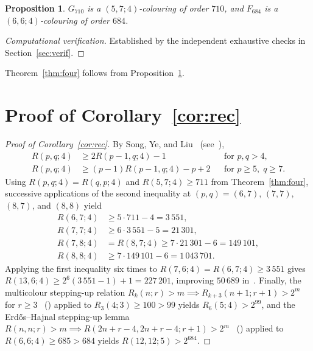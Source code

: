 \documentclass[11pt]{article}
\newtheorem{proposition}[theorem]{Proposition}
\theoremstyle{remark}
\begin{document}
\begin{proposition}\label{prop:proj}
$G_{710}$ is a $(5,7;4)$-colouring of order $710$, and $F_{684}$ is a
$(6,6;4)$-colouring of order $684$.
\end{proposition}

\begin{proof}[Computational verification]
Established by the independent exhaustive checks in Section~\ref{sec:verif}.
\end{proof}

Theorem~\ref{thm:four} follows from Proposition~\ref{prop:proj}.

\section{Proof of Corollary~\ref{cor:rec}}\label{sec:conseq}

\begin{proof}[Proof of Corollary~\ref{cor:rec}]
By Song, Ye, and Liu~\cite{sonyl} (see~\cite[Section~7.1(e)]{survey}),
\begin{align*}
  R(p,q;4) &\ge 2R(p-1,q;4)-1 && \text{for } p,q>4,\\
  R(p,q;4) &\ge (p-1)R(p-1,q;4)-p+2 && \text{for } p\ge 5,\; q\ge 7.
\end{align*}
Using $R(p,q;4)=R(q,p;4)$ and $R(5,7;4)\ge 711$ from Theorem~\ref{thm:four},
successive applications of the second inequality at $(p,q)=(6,7)$, $(7,7)$,
$(8,7)$, and $(8,8)$ yield
\begin{align*}
  R(6,7;4) &\ge 5\cdot 711 - 4 = 3\,551,\\
  R(7,7;4) &\ge 6\cdot 3\,551 - 5 = 21\,301,\\
  R(7,8;4) &= R(8,7;4) \ge 7\cdot 21\,301 - 6 = 149\,101,\\
  R(8,8;4) &\ge 7\cdot 149\,101 - 6 = 1\,043\,701.
\end{align*}
Applying the first inequality six times to $R(7,6;4)=R(6,7;4)\ge 3\,551$ gives
$R(13,6;4)\ge 2^6(3\,551-1)+1=227\,201$, improving $50\,689$
in~\cite[Section~7.1(f)]{survey}. Finally, the multicolour stepping-up relation
$R_k(n;r)>m \implies R_{k+3}(n+1;r+1)>2^m$ for $r\ge 3$~\cite{jaksy}
(\cite[Section~7.5(b)]{survey}) applied to $R_3(4;3)\ge 100>99$ yields
$R_6(5;4)>2^{99}$, and the Erd\H{o}s--Hajnal stepping-up lemma
$R(n,n;r)>m \implies R(2n+r-4,2n+r-4;r+1)>2^m$~\cite[p.~106]{grs}
(\cite[Section~7.5(a)]{survey}) applied to $R(6,6;4)\ge 685>684$ yields
$R(12,12;5)>2^{684}$.
\end{proof}
\end{document}
